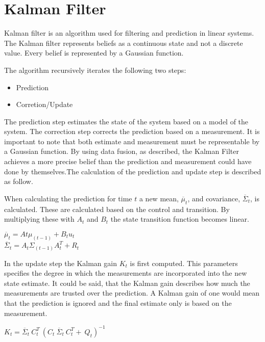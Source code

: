 \chapter{Kalman Filter}
\label{chp:kalman}

Kalman filter is an algorithm used for filtering and prediction in linear systems. The Kalman filter represents beliefs as a continuous state and not a discrete value. Every belief is represented by a Gaussian function.

The algorithm recursively iterates the following two steps:

\begin{itemize}
	\item Prediction
	\item Corretion/Update
\end{itemize}

The prediction step estimates the state of the system based on a model of the system. The correction step corrects the prediction based on a measurement. It is important to note that both estimate and measurement must be representable by a Gaussian function. By using data fusion, as described, the Kalman Filter achieves a more precise belief than the prediction and measurement could have done by themselves.The calculation of the prediction and update step is described as follow.

When calculating the prediction for time $t$ a new mean, $\overline{\mu}_t$, and covariance, $\overline{\Sigma}_t$, is calculated. These are calculated based on the control and transition. By multiplying these with $A_t$ and $B_t$ the state transition function becomes linear.

\begin{center}
$\overline{\mu}_t = At \mu_(t-1)+B_t u_t$  \\
$\overline{\Sigma}_t = A_t \Sigma_(t-1) A^T_t+R_t $ \\
\end{center}

In the update step the Kalman gain $K_t$ is first computed. This parameters specifies the degree in which the measurements are incorporated into the new state estimate. It could be said, that the Kalman gain describes how much the measurements are trusted over the prediction. A Kalman gain of one would mean that the prediction is ignored and the final estimate only is based on the measurement.

\begin{center}
$K_t = \overline{\Sigma}_t \ C^T_t \ (C_t \ \overline{\Sigma}_t \ C^T_t +\ Q_t )^{-1}$ \\
\end{center}	

